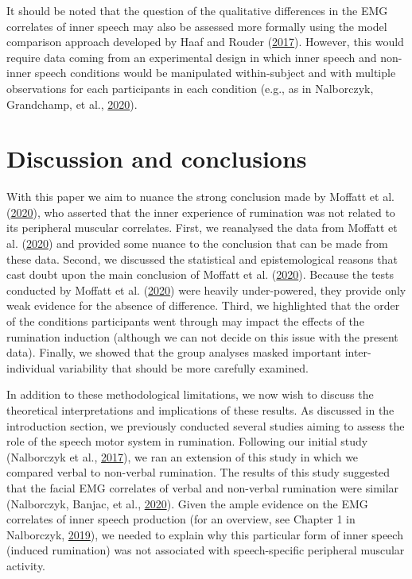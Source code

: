 \documentclass[
  english,
  man, donotrepeattitle,floatsintext]{apa6}
\begin{document}
It should be noted that the question of the qualitative differences in the EMG correlates of inner speech may also be assessed more formally using the model comparison approach developed by Haaf and Rouder (\protect\hyperlink{ref-haaf_developing_2017}{2017}). However, this would require data coming from an experimental design in which inner speech and non-inner speech conditions would be manipulated within-subject and with multiple observations for each participants in each condition (e.g., as in Nalborczyk, Grandchamp, et al., \protect\hyperlink{ref-nalborczyk_can_2020}{2020}).

\hypertarget{discussion-and-conclusions}{%
\section{Discussion and conclusions}\label{discussion-and-conclusions}}

With this paper we aim to nuance the strong conclusion made by Moffatt et al. (\protect\hyperlink{ref-moffatt_inner_2020}{2020}), who asserted that the inner experience of rumination was not related to its peripheral muscular correlates. First, we reanalysed the data from Moffatt et al. (\protect\hyperlink{ref-moffatt_inner_2020}{2020}) and provided some nuance to the conclusion that can be made from these data. Second, we discussed the statistical and epistemological reasons that cast doubt upon the main conclusion of Moffatt et al. (\protect\hyperlink{ref-moffatt_inner_2020}{2020}). Because the tests conducted by Moffatt et al. (\protect\hyperlink{ref-moffatt_inner_2020}{2020}) were heavily under-powered, they provide only weak evidence for the absence of difference. Third, we highlighted that the order of the conditions participants went through may impact the effects of the rumination induction (although we can not decide on this issue with the present data). Finally, we showed that the group analyses masked important inter-individual variability that should be more carefully examined.

In addition to these methodological limitations, we now wish to discuss the theoretical interpretations and implications of these results. As discussed in the introduction section, we previously conducted several studies aiming to assess the role of the speech motor system in rumination. Following our initial study (Nalborczyk et al., \protect\hyperlink{ref-nalborczyk_orofacial_2017}{2017}), we ran an extension of this study in which we compared verbal to non-verbal rumination. The results of this study suggested that the facial EMG correlates of verbal and non-verbal rumination were similar (Nalborczyk, Banjac, et al., \protect\hyperlink{ref-nalborczyk_dissociating_2020}{2020}). Given the ample evidence on the EMG correlates of inner speech production (for an overview, see Chapter 1 in Nalborczyk, \protect\hyperlink{ref-nalborczyk_understanding_2019}{2019}), we needed to explain why this particular form of inner speech (induced rumination) was not associated with speech-specific peripheral muscular activity.
\end{document}
